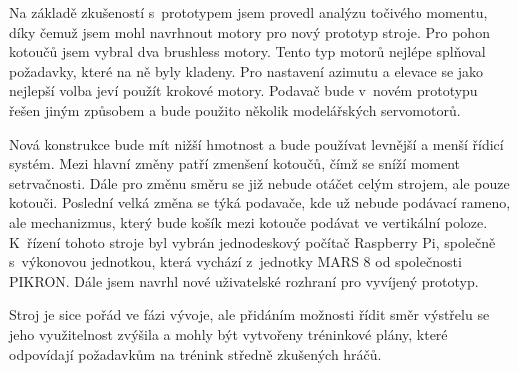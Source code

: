 Na základě zkušeností s~prototypem jsem provedl analýzu točivého momentu, díky čemuž jsem mohl navrhnout motory pro nový prototyp stroje. Pro pohon kotoučů jsem vybral dva brushless motory. Tento typ motorů nejlépe splňoval požadavky, které na ně byly kladeny. Pro nastavení azimutu a elevace se jako nejlepší volba jeví použít krokové motory. Podavač bude v~novém prototypu řešen jiným způsobem a bude použito několik modelářských servomotorů.

Nová konstrukce bude mít nižší hmotnost a bude používat levnější a menší řídicí systém. Mezi hlavní změny patří zmenšení kotoučů, čímž se sníží moment setrvačnosti. Dále pro změnu směru se již nebude otáčet celým strojem, ale pouze kotouči. Poslední velká změna se týká podavače, kde už nebude podávací rameno, ale mechanizmus, který bude košík mezi kotouče podávat ve vertikální poloze. K~řízení tohoto stroje byl vybrán jednodeskový počítač Raspberry Pi, společně s~výkonovou jednotkou, která vychází z~jednotky MARS 8 od společnosti PIKRON. Dále jsem navrhl nové uživatelské rozhraní pro vyvíjený prototyp.

Stroj je sice pořád ve fázi vývoje, ale přidáním možnosti řídit směr výstřelu se jeho využitelnost zvýšila a mohly být vytvořeny tréninkové plány, které odpovídají požadavkům na trénink středně zkušených hráčů.




